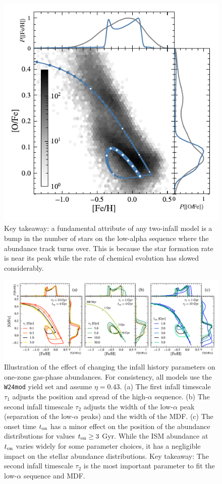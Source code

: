 \documentclass[twocolumn,twocolappendix,linenumbers]{aastex631}
\begin{document}
\begin{figure}
    \centering
    \includegraphics{figures/onezone_sfr.pdf}
    \caption{Key takeaway: a fundamental attribute of any two-infall model is a bump in the number of stars on the low-alpha sequence where the abundance track turns over. This is because the star formation rate is near its peak while the rate of chemical evolution has slowed considerably.}
    \label{fig:onezone-sfr}
\end{figure}

\begin{figure}
    \centering
    \includegraphics{figures/onezone_params_low_yields.pdf}
    \caption{Illustration of the effect of changing the infall history parameters on one-zone gas-phase abundances. For consistency, all models use the {\tt W24mod} yield set and assume $\eta=0.43$. (a) The first infall timescale $\tau_1$ adjusts the position and spread of the high-$\alpha$ sequence. (b) The second infall timescale $\tau_2$ adjusts the width of the low-$\alpha$ peak (separation of the low-$\alpha$ peaks) and the width of the MDF. (c) The onset time $t_{\rm on}$ has a minor effect on the position of the abundance distributions for values $t_{\rm on}\ge 3$ Gyr. While the ISM abundance at $t_{\rm on}$ varies widely for some parameter choices, it has a negligible impact on the stellar abundance distributions. Key takeaway: The second infall timescale $\tau_2$ is the most important parameter to fit the low-$\alpha$ sequence and MDF.}
    \label{fig:twoinfall-parameters-low-yields}
\end{figure}
\end{document}
